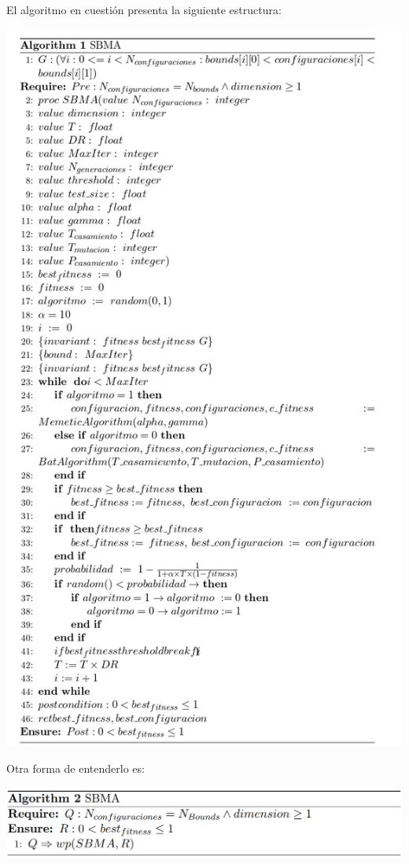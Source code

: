 El algoritmo en cuestión presenta la siguiente estructura:

\includegraphics[scale=0.65]{Imagenes/first_pseudocode.jpg}

Otra forma de entenderlo es:
\begin{center}
\includegraphics[scale=0.2]{Imagenes/second_pseudocode.png}
\end{center}
